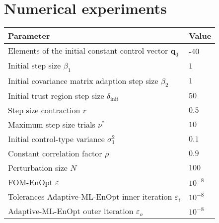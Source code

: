 \chapter{Numerical experiments}

\begin{tabular}{ll}
\hline
Parameter & Value\\
\hline
Elements of the initial constant control vector $\mathbf{q}_0$ & -40\\
Initial step size $\beta_1$ & $1$\\
Initial covariance matrix adaption step size $\beta_2$ & $1$\\
Initial trust region step size $\delta_\mathrm{init}$ & $50$\\
Step size contraction $r$ & $0.5$\\
Maximum step size trials $\nu^*$ & $10$\\
Initial control-type variance $\sigma^2_1$ & $0.1$\\
Constant correlation factor $\rho$ & $0.9$\\
Perturbation size $N$ & $100$\\
FOM-EnOpt $\varepsilon$ & $10^{-8}$\\
Tolerances Adaptive-ML-EnOpt inner iteration $\varepsilon_i$ & $10^{-8}$\\
Adaptive-ML-EnOpt outer iteration $\varepsilon_o$ & $10^{-8}$\\
\hline
\end{tabular}

